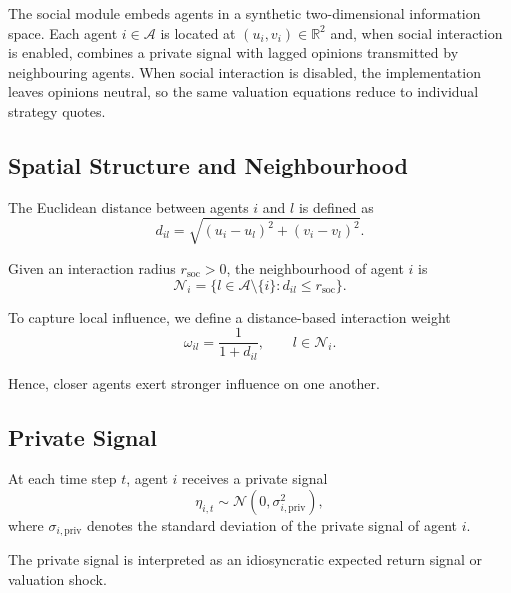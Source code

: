 \documentclass[12pt, a4paper]{article}
\begin{document}
    The social module embeds agents in a synthetic two-dimensional information
    space. Each agent \(i\in\mathcal{A}\) is located at
    \((u_i,v_i)\in\mathbb{R}^2\) and, when social interaction is enabled, combines
    a private signal with lagged opinions transmitted by neighbouring agents. When
    social interaction is disabled, the implementation leaves opinions neutral, so
    the same valuation equations reduce to individual strategy quotes.

    \subsection{Spatial Structure and Neighbourhood}

    The Euclidean distance between agents \(i\) and \(l\) is defined as
    \begin{equation}
        d_{il} = \sqrt{{\left(u_i-u_l\right)}^2 + {\left(v_i-v_l\right)}^2}.
    \end{equation}

    Given an interaction radius \(r_{\mathrm{soc}}>0\), the neighbourhood of agent
    \(i\) is
    \begin{equation}
        \mathcal{N}_i = \{l \in \mathcal{A}\setminus\{i\} : d_{il} \le r_{\mathrm{soc}}\}.
    \end{equation}

    To capture local influence, we define a distance-based interaction weight
    \begin{equation}
        \omega_{il} = \frac{1}{1+d_{il}}, \qquad l \in \mathcal{N}_i.
    \end{equation}

    Hence, closer agents exert stronger influence on one another.

    \subsection{Private Signal}

    At each time step \(t\), agent \(i\) receives a private signal
    \begin{equation}
        \eta_{i,t} \sim \mathcal{N}(0,\sigma_{i,\text{priv}}^2),
    \end{equation}
    where \(\sigma_{i,\text{priv}}\) denotes the standard deviation of the private
    signal of agent \(i\).

    The private signal is interpreted as an idiosyncratic expected return signal or valuation shock.
\end{document}
